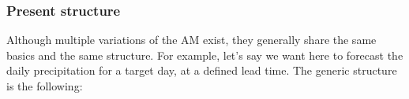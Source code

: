 \documentclass[review]{elsarticle}
\begin{document}
















\subsubsection{Present structure}

Although multiple variations of the AM exist, they generally share the same basics and the same structure. For example, let's say we want here to forecast the daily precipitation for a target day, at a defined lead time. The generic structure is the following:
\end{document}
